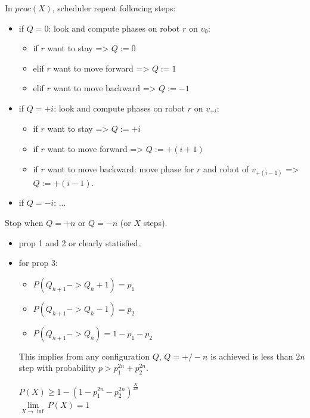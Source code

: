 \documentclass{beamer}
\begin{document}
\begin{frame}
	In $proc(X)$, scheduler repeat following steps:
	\begin{itemize}
		\item if $Q = 0$: look and compute phases on robot $r$ on $v_0$:
		\begin{itemize}
			\item if $r$ want to stay => $Q:=0$
			\item elif $r$ want to move forward => $Q := 1$
			\item elif $r$ want to move backward => $Q := -1$
		\end{itemize}
		\pause
		\item if $Q = +i$: look and compute phases on robot $r$ on $v_{+i}$:
		\begin{itemize}
			\item if $r$ want to stay => $Q := +i$
			\item if $r$ want to move forward => $Q := +(i+1)$
			\item if $r$ want to move backward: move phase for $r$ and robot of $v_{+(i-1)}$
			 => $Q := +(i-1)$.	
		\end{itemize}
		\pause
		\item if $Q = -i$: ...
	\end{itemize}
	\pause
	Stop when $Q = +n$ or $Q = -n$ (or $X$ steps).
\end{frame}
\begin{frame}
	\begin{itemize}
		\item prop 1 and 2 or clearly statisfied.
		\pause
		\item for prop 3:
		\begin{itemize}
			\item $P(Q_{h+1} -> Q_h + 1) = p_1$
			\item $P(Q_{h+1} -> Q_h - 1) = p_2$
			\item $P(Q_{h+1} -> Q_h) = 1 - p_1 - p_2$
		\end{itemize}
		\pause
		This implies from any configuration $Q$, $Q = +/- n$ is achieved is less than $2n$
		step with probability $p > p_1^{2n} + p_2^{2n}$.
		\pause
		\begin{center}
			\begin{math}
				P(X) \geq 1 - (1 - p_1^{2n} - p_2^{2n})^{\frac{X}{2n}}
			\end{math} \\ 
			\pause
			\begin{math}
				\lim\limits_{X \to \inf}{P(X)} = 1
			\end{math}
		\end{center}
	\end{itemize}
\end{frame}
\end{document}
